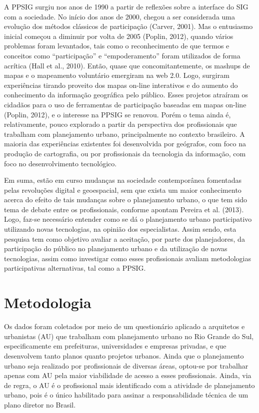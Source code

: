 \documentclass{article}
\begin{document}
\begin{multicols}{2}
A PPSIG surgiu nos anos de 1990 a partir de reflexões sobre a interface do SIG
com a
sociedade. No início dos anos de 2000, chegou a ser considerada uma evolução dos
métodos clássicos de participação (Carver,
2001). Mas o entusiasmo inicial começou a diminuir por volta de 2005
(Poplin, 2012), quando vários problemas
foram levantados, tais como o reconhecimento de que termos e conceitos como
“participação” e “empoderamento” foram utilizados de forma acrítica (Hall et
al., 2010). Então, quase que
concomitantemente, os mashups de mapas e o mapeamento voluntário
emergiram na web 2.0. Logo, surgiram experiências tirando proveito dos mapas
on-line
interativos e do aumento do conhecimento da informação geográfica pelo público.
Esses projetos atraíram os cidadãos para o uso de ferramentas de participação
baseadas em mapas on-line (Poplin, 2012), e
o interesse na PPSIG se renovou. Porém o tema ainda é, relativamente, pouco
explorado a partir da perspectiva dos profissionais que trabalham com
planejamento
urbano, principalmente no contexto brasileiro. A maioria das experiências
existentes
foi desenvolvida por geógrafos, com foco na produção de cartografia, ou por
profissionais da tecnologia da informação, com foco no desenvolvimento
tecnológico.

Em suma, estão em curso mudanças na sociedade contemporânea fomentadas pelas
revoluções digital e geoespacial, sem que exista um maior conhecimento acerca do
efeito de tais mudanças sobre o planejamento urbano, o que tem sido tema de
debate
entre os profissionais, conforme apontam Pereira et
al. (2013). Logo, faz-se necessário entender como se dá o planejamento
urbano participativo utilizando novas tecnologias, na opinião dos especialistas.
Assim sendo, esta pesquisa tem como objetivo avaliar a aceitação, por parte dos
planejadores, da participação do público no planejamento urbano e da utilização
de
novas tecnologias, assim como investigar como esses profissionais avaliam
metodologias participativas alternativas, tal como a PPSIG.

\section{Metodologia}

Os dados foram coletados por meio de um questionário aplicado a arquitetos e
urbanistas (AU) que trabalham com planejamento urbano no Rio Grande do Sul,
especificamente em prefeituras, universidades e empresas privadas, e que
desenvolvem
tanto planos quanto projetos urbanos. Ainda que o planejamento urbano seja
realizado
por profissionais de diversas áreas, optou-se por trabalhar apenas com AU pela
maior
viabilidade de acesso a esses profissionais. Ainda, via de regra, o AU é o
profissional mais identificado com a atividade de planejamento urbano, pois é o
único habilitado para assinar a responsabilidade técnica de um plano diretor no
Brasil.


\end{multicols}
\end{document}
